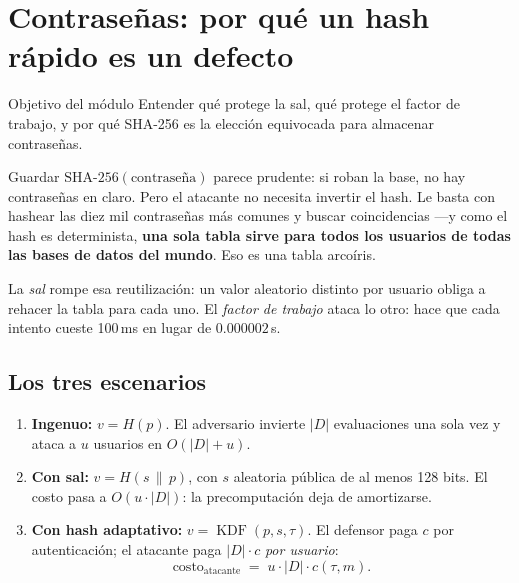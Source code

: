 \documentclass[11pt,a4paper]{article}
\theoremstyle{definition}
\theoremstyle{plain}
\theoremstyle{remark}
\newcommand{\concat}{\,\|\,}
\DeclareMathOperator{\KDF}{KDF}
\begin{document}
\section{Contraseñas: por qué un hash rápido es un defecto}

\begin{nota}{Objetivo del módulo}
Entender qué protege la sal, qué protege el factor de trabajo, y por qué SHA-256
es la elección equivocada para almacenar contraseñas.
\end{nota}

Guardar $\mathrm{SHA\text{-}256}(\text{contraseña})$ parece prudente: si roban la
base, no hay contraseñas en claro. Pero el atacante no necesita invertir el hash.
Le basta con hashear las diez mil contraseñas más comunes y buscar coincidencias
---y como el hash es determinista, \textbf{una sola tabla sirve para todos los
usuarios de todas las bases de datos del mundo}. Eso es una tabla arcoíris.

La \emph{sal} rompe esa reutilización: un valor aleatorio distinto por usuario
obliga a rehacer la tabla para cada uno. El \emph{factor de trabajo} ataca lo
otro: hace que cada intento cueste 100\,ms en lugar de $0.000002$\,s.

\subsection{Los tres escenarios}

\begin{enumerate}[leftmargin=2.2em,itemsep=0.35em]
  \item \textbf{Ingenuo:} $v = H(p)$. El adversario invierte $|D|$ evaluaciones
    una sola vez y ataca a $u$ usuarios en $O(|D| + u)$.
  \item \textbf{Con sal:} $v = H(s \concat p)$, con $s$ aleatoria pública de al
    menos 128 bits. El costo pasa a $O(u\cdot|D|)$: la precomputación deja de
    amortizarse.
  \item \textbf{Con hash adaptativo:} $v = \KDF(p, s, \tau)$. El defensor paga
    $c$ por autenticación; el atacante paga $|D|\cdot c$ \emph{por usuario}:
    \[
      \mathrm{costo}_{\text{atacante}} \;=\; u \cdot |D| \cdot c(\tau, m).
    \]
\end{enumerate}
\end{document}
